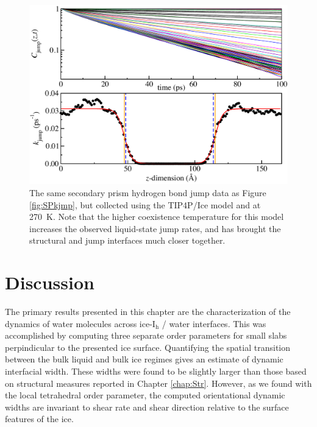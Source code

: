 \begin{figure}
\includegraphics[width=\linewidth]{Figures/secprismJumpPlotTIP4PIce}
\caption{\label{fig:SPTIP4Pkjmp} The same secondary prism hydrogen
  bond jump data as Figure \ref{fig:SPkjmp}, but collected using the
  TIP4P/Ice model and at 270~K.  Note that the higher coexistence
  temperature for this model increases the observed liquid-state jump
  rates, and has brought the structural and jump interfaces much
  closer together.}
\end{figure}


\section{Discussion}
The primary results presented in this chapter are the characterization
of the dynamics of water molecules across ice-I$_\mathrm{h}$ / water
interfaces. This was accomplished by computing three separate order
parameters for small slabs perpindicular to the presented ice
surface. Quantifying the spatial transition between the bulk liquid
and bulk ice regimes gives an estimate of dynamic interfacial
width. These widths were found to be slightly larger than those based
on structural measures reported in Chapter \ref{chap:Str}. However, as
we found with the local tetrahedral order parameter, the computed
orientational dynamic widths are invariant to shear rate and shear
direction relative to the surface features of the ice.

